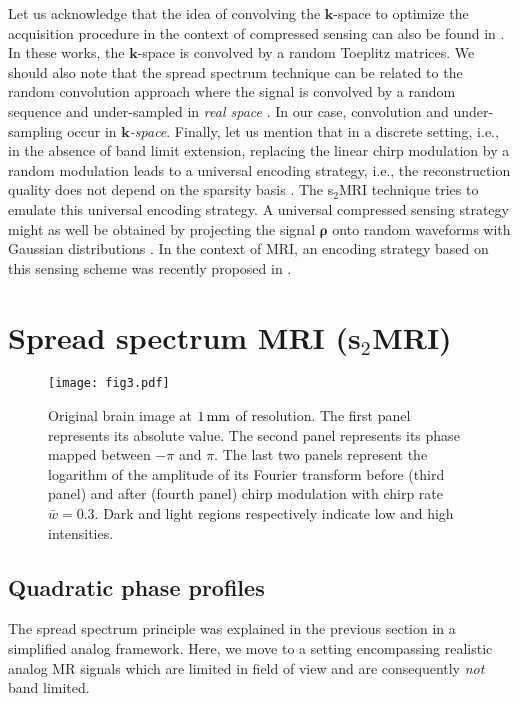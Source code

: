 \documentclass[10pt,draftcls, onecolumn]{IEEEtran}
\begin{document}
Let us acknowledge that the idea of convolving the $\bm k$-space to optimize the acquisition procedure in the context of compressed sensing can also be found in \cite{sebert08, liang09b, wang09}. In these works, the $\bm{k}$-space is convolved by a random Toeplitz matrices. We should also note that the spread spectrum technique can be related to the random convolution approach where the signal is convolved by a random sequence and under-sampled in \emph{real space} \cite{romberg09}. In our case, convolution and under-sampling occur in \emph{$\bm k$-space}. Finally, let us mention that in a discrete setting, i.e., in the absence of band limit extension, replacing the linear chirp modulation by a random modulation leads to a universal encoding strategy, i.e., the reconstruction quality does not depend on the sparsity basis \cite{puy11a}. The s$_2$MRI technique tries to emulate this universal encoding strategy. A universal compressed sensing strategy might as well be obtained by projecting the signal $\bm{\rho}$ onto random waveforms with Gaussian distributions \cite{candes06c, donoho06}. In the context of MRI, an encoding strategy based on this sensing scheme was recently proposed in \cite{haldar10}.

\section{Spread spectrum MRI (s$_2$MRI)}
\label{sec:MR measurements}

\begin{figure}
\centering
\texttt{[image: fig3.pdf]}
\caption{\label{fig:original image}Original brain image at $1\,\rm{mm}$ of resolution. The first panel represents its absolute value. The second panel represents its phase mapped between $-\pi$ and $\pi$. The last two panels represent the logarithm of the amplitude of its Fourier transform before (third panel) and after (fourth panel) chirp modulation with chirp rate $\bar{w} = 0.3$. Dark and light regions respectively indicate low and high intensities.}
\end{figure}


\subsection{Quadratic phase profiles}
\label{sub:Quadratic phase profiles}

The spread spectrum principle was explained in the previous section in a simplified analog framework. Here, we move to a setting encompassing realistic analog MR signals which are limited in field of view and are consequently \emph{not} band limited.
\end{document}
